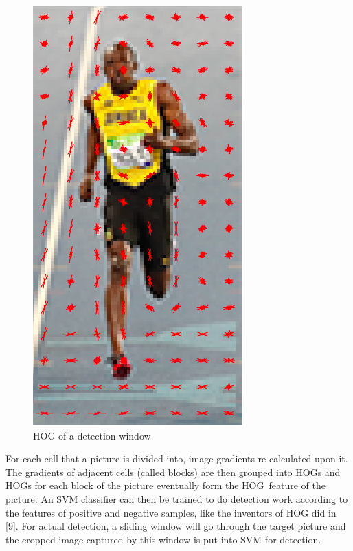 \documentclass{article}
\begin{document}
\begin{figure}
  \centering
  \includegraphics[scale=0.3]{report/pic/2/HOG_of_a_picture.png} 
  \caption{HOG of a detection window}
\end{figure}
For each cell that a picture is divided into, image gradients re calculated upon it. The gradients of adjacent cells (called blocks) are then grouped into HOGs and HOGs for each block of the picture eventually form the HOG\ feature of the picture. An SVM classifier can then be trained to do detection work according to the features of positive and negative samples, like the inventors of HOG did in [9]. For actual detection, a sliding window will go through the target picture and the cropped image captured by this window is put into SVM for detection.
\end{document}
